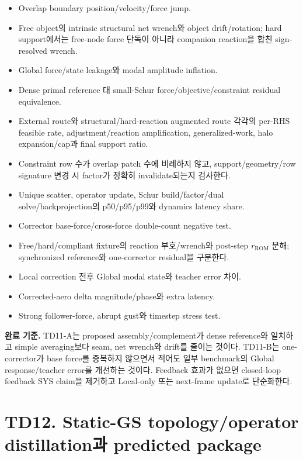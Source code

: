 \documentclass[10pt,a4paper]{article}
\newcommand{\todo}{\textcolor{TodoGray}{\(\square\)}}
\begin{document}
\begin{itemize}
  \item[\todo] Overlap boundary position/velocity/force jump.
  \item[\todo] Free object의 intrinsic structural net wrench와 object drift/rotation;
  hard support에서는 free-node force 단독이 아니라 companion reaction을 합친 sign-resolved wrench.
  \item[\todo] Global force/state leakage와 modal amplitude inflation.
  \item[\todo] Dense primal reference 대 small-Schur force/objective/constraint residual equivalence.
  \item[\todo] External route와 structural/hard-reaction augmented route 각각의 per-RHS feasible rate,
  adjustment/reaction amplification, generalized-work, halo expansion/cap과 final support ratio.
  \item[\todo] Constraint row 수가 overlap patch 수에 비례하지 않고,
  support/geometry/row signature 변경 시 factor가 정확히 invalidate되는지 검사한다.
  \item[\todo] Unique scatter, operator update, Schur build/factor/dual solve/backprojection의 p50/p95/p99와 dynamics latency share.
  \item[\todo] Corrector base-force/cross-force double-count negative test.
  \item[\todo] Free/hard/compliant fixture의 reaction 부호/wrench와 post-step
  \(r_{\mathrm{ROM}}\) 분해; synchronized reference와 one-corrector residual을 구분한다.
  \item[\todo] Local correction 전후 Global modal state와 teacher error 차이.
  \item[\todo] Corrected-aero delta magnitude/phase와 extra latency.
  \item[\todo] Strong follower-force, abrupt gust와 timestep stress test.
\end{itemize}

\textbf{완료 기준.}
TD11-A는 proposed assembly/complement가 dense reference와 일치하고 simple averaging보다 seam,
net wrench와 drift를 줄이는 것이다. TD11-B는 one-corrector가 base force를 중복하지 않으면서
적어도 일부 benchmark의 Global response/teacher error를 개선하는 것이다.
Feedback 효과가 없으면 closed-loop feedback SYS claim을 제거하고 Local-only 또는 next-frame update로 단순화한다.

\section{TD12. Static-GS topology/operator distillation과 predicted package}
\end{document}
